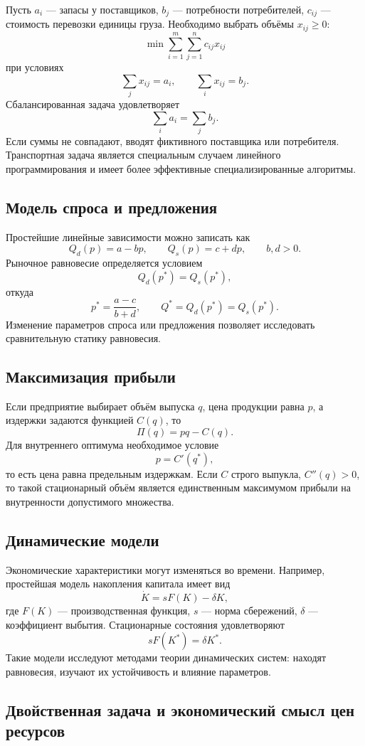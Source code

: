 Пусть $a_i$ --- запасы у поставщиков, $b_j$ --- потребности потребителей,
$c_{ij}$ --- стоимость перевозки единицы груза. Необходимо выбрать объёмы
$x_{ij}\ge0$:
\[
\boxed{
\min\sum_{i=1}^m\sum_{j=1}^n c_{ij}x_{ij}
}
\]
при условиях
\[
\sum_jx_{ij}=a_i,
\qquad
\sum_ix_{ij}=b_j.
\]
Сбалансированная задача удовлетворяет
\[
\sum_i a_i=\sum_j b_j.
\]
Если суммы не совпадают, вводят фиктивного поставщика или потребителя.
Транспортная задача является специальным случаем линейного
программирования и имеет более эффективные специализированные алгоритмы.

\subsection{Модель спроса и предложения}

Простейшие линейные зависимости можно записать как
\[
Q_d(p)=a-bp,
\qquad
Q_s(p)=c+dp,
\qquad b,d>0.
\]
Рыночное равновесие определяется условием
\[
Q_d(p^*)=Q_s(p^*),
\]
откуда
\[
\boxed{p^*=\frac{a-c}{b+d}},
\qquad
Q^*=Q_d(p^*)=Q_s(p^*).
\]
Изменение параметров спроса или предложения позволяет исследовать
сравнительную статику равновесия.

\subsection{Максимизация прибыли}

Если предприятие выбирает объём выпуска $q$, цена продукции равна $p$, а
издержки задаются функцией $C(q)$, то
\[
\Pi(q)=pq-C(q).
\]
Для внутреннего оптимума необходимое условие
\[
\boxed{p=C'(q^*)},
\]
то есть цена равна предельным издержкам. Если $C$ строго выпукла,
$C''(q)>0$, то такой стационарный объём является единственным максимумом
прибыли на внутренности допустимого множества.

\subsection{Динамические модели}

Экономические характеристики могут изменяться во времени. Например,
простейшая модель накопления капитала имеет вид
\[
\dot K=sF(K)-\delta K,
\]
где $F(K)$ --- производственная функция, $s$ --- норма сбережений,
$\delta$ --- коэффициент выбытия. Стационарные состояния удовлетворяют
\[
sF(K^*)=\delta K^*.
\]
Такие модели исследуют методами теории динамических систем: находят
равновесия, изучают их устойчивость и влияние параметров.


\subsection{Двойственная задача и экономический смысл цен ресурсов}

